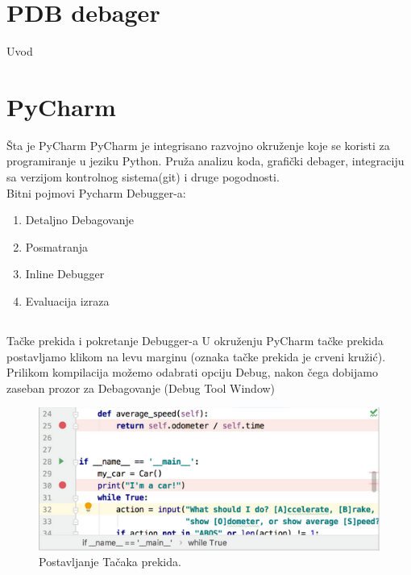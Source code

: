 \documentclass{beamer}
\begin{document}
\section{PDB debager}
\begin{frame}{Uvod}
    
\end{frame}
\section{PyCharm}
\begin{frame}{Šta je PyCharm}
PyCharm je integrisano razvojno okruženje koje se koristi za programiranje u jeziku Python. Pruža analizu koda, grafički debager, integraciju sa verzijom kontrolnog sistema(git) i druge pogodnosti.\\
Bitni pojmovi Pycharm Debugger-a:
\begin{enumerate}
    \item Detaljno Debagovanje
    \item Posmatranja
    \item Inline Debugger
    \item Evaluacija izraza
\end{enumerate}
\end{frame}
\subsection{}
\begin{frame}{Tačke prekida i pokretanje Debugger-a}
U okruženju PyCharm tačke prekida postavljamo klikom na levu marginu (oznaka tačke prekida je crveni kružić).\\
Prilikom kompilacija možemo odabrati opciju Debug, nakon čega dobijamo zaseban prozor za Debagovanje (Debug Tool Window)
\begin{figure}[h!]
\begin{center}
\includegraphics[scale = 0.4]{1}
\end{center}
\caption{Postavljanje Tačaka prekida.}
\label{1}
\end{figure}
    
\end{frame}
\end{document}
